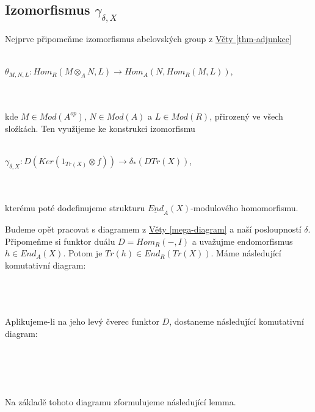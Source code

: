       
    \subsection{Izomorfismus $\gamma_{\delta,X}$}
        
        Nejprve připomeňme izomorfismus abelovských group z \hyperref[thm-adjunkce]{Věty \ref*{thm-adjunkce}} 
        \\\\
        \centerline{$\theta_{M,N,L}:Hom_R(M\otimes_A N,L)\rightarrow Hom_A(N,Hom_R(M,L))$,} 
        \\\\
        kde $M\in Mod(A^{op})$, $N\in Mod(A)$ a $L\in Mod(R)$, přirozený ve všech složkách. Ten využijeme ke 
        konstrukci izomorfismu 
        \\\\
        \centerline{$\gamma_{\delta, X}:D(Ker(1_{Tr(X)}\otimes f)) \rightarrow \delta_*(DTr(X))$,}
        \\\\
        kterému poté dodefinujeme strukturu $\underline{End}_A(X)$-modulového 
        homomorfismu.
        
        Budeme opět pracovat s diagramem z \hyperref[mega-diagram]{Věty 
        \ref*{mega-diagram}} a naší posloupností $\delta$. 
        Připomeňme si funktor duálu $D=Hom_R(-,I)$ 
        a uvažujme endomorfismus $h\in End_A(X)$. Potom je $Tr(h)\in End_R(Tr(X))$. 
        Máme následující komutativní diagram:\\
        \centerline{}\\\\\\
        Aplikujeme-li na jeho levý čverec funktor $D$, dostaneme následující komutativní 
        diagram:\\\\
        \centerline{}\\\\\\
        Na základě tohoto diagramu zformulujeme následující lemma.
                 
